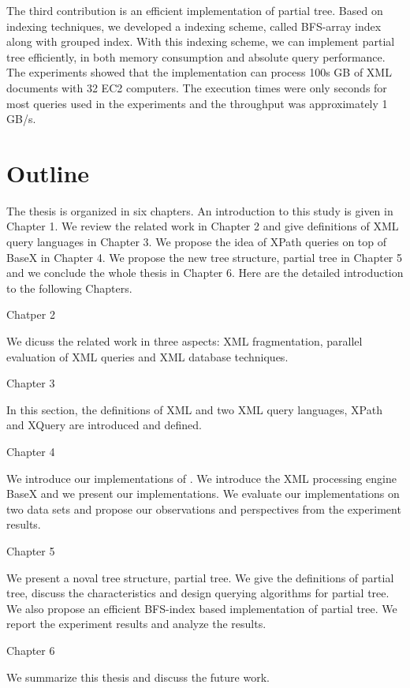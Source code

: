 The third contribution is an efficient implementation of partial tree. Based on
indexing techniques, we developed a indexing scheme, called BFS-array index
along with grouped index. With this indexing scheme, we can implement partial
tree efficiently, in both memory consumption and absolute query performance. The
experiments showed that the implementation can process 100s GB of XML documents
with 32 EC2 computers. The execution times were only seconds for most queries
used in the experiments and the throughput was approximately 1 GB/s.


\section{Outline}

The thesis is organized in six chapters. An introduction to this study is given
in Chapter 1. We  review the  related work in Chapter 2 and
give definitions of XML query languages in Chapter 3.
We propose the idea of XPath queries on top of
BaseX in Chapter 4. We propose the new tree structure, partial tree in Chapter 5
and  we conclude the whole thesis in Chapter 6. Here are the detailed
introduction to the following Chapters.

Chatper 2

We dicuss the related work in three aspects: XML
fragmentation, parallel evaluation of XML queries and XML database techniques.

Chapter 3

In this section, the definitions of XML and two XML query
languages, XPath and XQuery are introduced and defined.

Chapter 4

We introduce our implementations of \cite{BoLS09}.  We
introduce the XML processing engine BaseX and we present our implementations.
We evaluate our implementations on two data sets and propose our observations
and perspectives from the experiment results.

Chapter 5

We present a noval tree structure, partial tree. We give
the definitions of partial tree, discuss the characteristics and design querying
algorithms for partial tree. We also propose an efficient BFS-index based
implementation of partial tree. We report the experiment results and analyze the
results.

Chapter 6

We summarize this thesis and discuss the future work.
